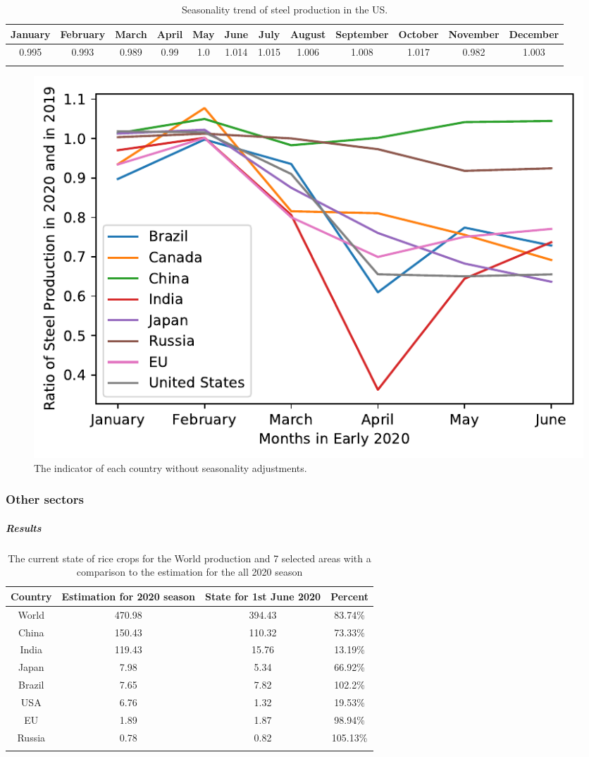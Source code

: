 	
	\begin{table}[h!]
		\centering
		\begin{tabular}{cccccccccccc}
			\hline
			January & February & March & April & May & June & July & August & September & October & November & December\\
			\hline
			\hline
			0.995 & 0.993 & 0.989 & 0.99 & 1.0 & 1.014 & 1.015 & 1.006 & 1.008 & 1.017 & 0.982 & 1.003\\
			\hline &&&&&&&&&&& \\
			\end{tabular}
			\caption{Seasonality trend of steel production in the US.}%
			\label{tab:otherindustry_seasonality}
			\end{table}
			
			\begin{figure}[h]
				\centering
				\includegraphics[width=0.7\linewidth]{../predictions/otherindustries_notadjusted.pdf}
				\caption{The indicator of each country without seasonality adjustments.}
				\label{fig:otherindustry_notadjusted}
				\end{figure}


\subsubsection{Other sectors}

\subparagraph{Results}

\begin{table}[h!]
\centering
\begin{tabular}{c c c c} 
\hline
Country & Estimation for 2020 season & State for 1st June 2020 & Percent \\ 
\hline\hline
World & 470.98 & 394.43 & 83.74\% \\
China & 150.43 & 110.32 & 73.33\% \\ 
India & 119.43 & 15.76 & 13.19\% \\
Japan & 7.98 & 5.34 & 66.92\% \\
Brazil & 7.65 & 7.82 & 102.2\% \\
USA & 6.76 & 1.32 & 19.53\%  \\ 
EU & 1.89 & 1.87 & 98.94\% \\
Russia & 0.78 & 0.82 & 105.13\% \\
\hline
&&& \\
\end{tabular}
\caption{The current state of rice crops for the World production and 7 selected areas with a comparison to the estimation for the all 2020 season}
\label{tab:Current_production_rice}
\end{table}


